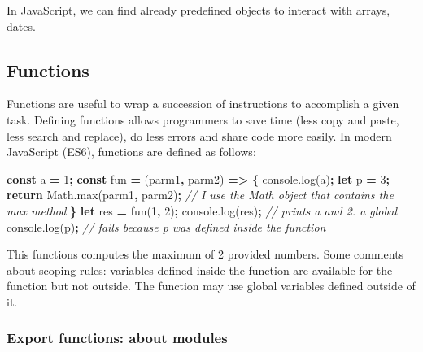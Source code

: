 \documentclass[]{book}
\newenvironment{Shaded}{\begin{snugshade}}{\end{snugshade}}
\newcommand{\AttributeTok}[1]{\textcolor[rgb]{0.77,0.63,0.00}{#1}}
\newcommand{\CommentTok}[1]{\textcolor[rgb]{0.56,0.35,0.01}{\textit{#1}}}
\newcommand{\ControlFlowTok}[1]{\textcolor[rgb]{0.13,0.29,0.53}{\textbf{#1}}}
\newcommand{\DecValTok}[1]{\textcolor[rgb]{0.00,0.00,0.81}{#1}}
\newcommand{\KeywordTok}[1]{\textcolor[rgb]{0.13,0.29,0.53}{\textbf{#1}}}
\newcommand{\NormalTok}[1]{#1}
\newcommand{\OperatorTok}[1]{\textcolor[rgb]{0.81,0.36,0.00}{\textbf{#1}}}
\newcommand{\VariableTok}[1]{\textcolor[rgb]{0.00,0.00,0.00}{#1}}
\begin{document}
In JavaScript, we can find already predefined objects to interact with arrays, dates.

\hypertarget{functions}{%
\subsection{Functions}\label{functions}}

Functions are useful to wrap a succession of instructions to accomplish a given task. Defining functions allows programmers to save time (less copy and paste, less search and replace), do less errors and share code more easily. In modern JavaScript (ES6), functions are defined as follows:

\begin{Shaded}
\begin{Highlighting}[]
\KeywordTok{const}\NormalTok{ a }\OperatorTok{=} \DecValTok{1}\OperatorTok{;}
\KeywordTok{const}\NormalTok{ fun }\OperatorTok{=}\NormalTok{ (parm1}\OperatorTok{,}\NormalTok{ parm2) }\OperatorTok{=>} \OperatorTok{\{}
  \VariableTok{console}\NormalTok{.}\AttributeTok{log}\NormalTok{(a)}\OperatorTok{;}
  \KeywordTok{let}\NormalTok{ p }\OperatorTok{=} \DecValTok{3}\OperatorTok{;}
  \ControlFlowTok{return} \VariableTok{Math}\NormalTok{.}\AttributeTok{max}\NormalTok{(parm1}\OperatorTok{,}\NormalTok{ parm2)}\OperatorTok{;} \CommentTok{// I use the Math object that contains the max method}
\OperatorTok{\}}
\KeywordTok{let}\NormalTok{ res }\OperatorTok{=} \AttributeTok{fun}\NormalTok{(}\DecValTok{1}\OperatorTok{,} \DecValTok{2}\NormalTok{)}\OperatorTok{;}
\VariableTok{console}\NormalTok{.}\AttributeTok{log}\NormalTok{(res)}\OperatorTok{;} \CommentTok{// prints a and 2. a global}
\VariableTok{console}\NormalTok{.}\AttributeTok{log}\NormalTok{(p)}\OperatorTok{;} \CommentTok{// fails because p was defined inside the function}
\end{Highlighting}
\end{Shaded}

This functions computes the maximum of 2 provided numbers. Some comments about scoping rules: variables defined inside the function are available for the function but not outside. The function may use global variables defined outside of it.

\hypertarget{export-functions-about-modules}{%
\subsubsection{Export functions: about modules}\label{export-functions-about-modules}}
\end{document}
